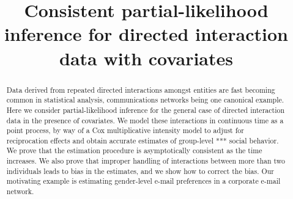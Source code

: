 \documentclass[aoas,preprint]{imsart}
\begin{document}
\begin{frontmatter}

\title{%
    Consistent partial-likelihood
    inference for directed interaction data with covariates
    \protect{}
}



\begin{abstract}
Data derived from repeated directed interactions amongst entities are fast becoming
common in statistical analysis, communications networks being one canonical example.  Here we consider partial-likelihood inference for the general case of directed interaction data in the presence of covariates.  We model these interactions in continuous time as a point process, by way of a Cox multiplicative intensity model to adjust for reciprocation effects and obtain accurate
estimates of group-level *** social behavior.  We prove that the estimation
procedure is asymptotically consistent as the time increases.  We also prove
that improper handling of interactions between more than two individuals
leads to bias in the estimates, and we show how to correct the bias.  Our
motivating example is estimating gender-level e-mail preferences in a
corporate e-mail network.


\end{abstract}
\end{frontmatter}
\end{document}
